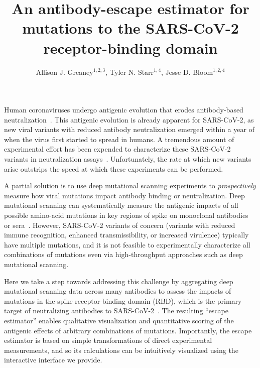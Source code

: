 \documentclass[9pt,twocolumn,twoside]{gsajnl_modified}
\title{An antibody-escape estimator for mutations to the SARS-CoV-2 receptor-binding domain}
\author[*]{\Large Allison J. Greaney$^{1,2,3}$, Tyler N. Starr$^{1,4}$, Jesse D. Bloom$^{1,2,4}$}
\affil[1]{Basic Sciences and Computational Biology, Fred Hutchinson Cancer Center

}
\affil[2]{Department of Genome Sciences, University of Washington

}
\affil[3]{Medical Scientist Training Program, University of Washington

}
\affil[4]{Howard Hughes Medical Institute

Seattle, WA, USA
}
\begin{document}
\maketitle
\thispagestyle{firststyle}
\firstpagefootnote

\vspace{-33pt}%

\lettrine[lines=2]{\color{color2}H}{}uman coronaviruses undergo antigenic evolution that erodes antibody-based neutralization~\citep{eguia2021human,kistler2021evidence}.
This antigenic evolution is already apparent for SARS-CoV-2, as new viral variants with reduced antibody neutralization emerged within a year of when the virus first started to spread in humans.
A tremendous amount of experimental effort has been expended to characterize these SARS-CoV-2 variants in neutralization assays~\citep{wang2021antibody,uriu2021neutralization,lucas2021impact}.
Unfortunately, the rate at which new variants arise outstrips the speed at which these experiments can be performed.

A partial solution is to use deep mutational scanning experiments to \emph{prospectively} measure how viral mutations impact antibody binding or neutralization.
Deep mutational scanning can systematically measure the antigenic impacts of all possible amino-acid mutations in key regions of spike on monoclonal antibodies~\citep{starr2021prospective,greaney2021complete} or sera~\citep{greaney2021comprehensive}.
However, SARS-CoV-2 variants of concern (variants with reduced immune recognition, enhanced transmissibility, or increased virulence) typically have multiple mutations, and it is not feasible to experimentally characterize all combinations of mutations even via high-throughput approaches such as deep mutational scanning.

Here we take a step towards addressing this challenge by aggregating deep mutational scanning data across many antibodies to assess the impacts of mutations in the spike receptor-binding domain (RBD), which is the primary target of neutralizing antibodies to SARS-CoV-2~\citep{piccoli2020mapping,greaney2021comprehensive,schmidt2021high}.
The resulting ``escape estimator'' enables qualitative visualization and quantitative scoring of the antigenic effects of arbitrary combinations of mutations.
Importantly, the escape estimator is based on simple transformations of direct experimental measurements, and so its calculations can be intuitively visualized using the interactive interface we provide. 
\end{document}
